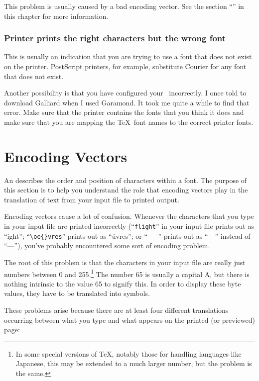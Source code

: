 This problem is usually caused by a bad encoding vector.  See the
section ``'' in this chapter for 
more information.

\subsubsection{Printer prints the right characters but the wrong font}

This is usually an indication that you are trying to use a font that
does not exist on the printer.  PostScript printers, for example,
substitute Courier for any font that does not exist.

Another possibility is that you have configured your \dvidriver\ incorrectly.
I once told  to download Galliard when I used Garamond.
It took me quite a while to find that error.
Make sure that the printer contains the fonts that you think it does
and make sure that you are mapping the \TeX\ font names to the correct printer
fonts.

\newpage
\section{Encoding Vectors}
\label{sec:fonts:encodingvec}

An  describes 
the order and position of characters within a
font.  The purpose of this section is to help you understand the role that
encoding vectors play in the translation of text from your input file to
printed output.

Encoding vectors cause a lot of confusion.  Whenever the characters that
you type in your input file are printed incorrectly (``\texttt{flight}'' in
your input file prints
out as ``ight''; ``\verb|\oe{}vres|'' prints out as ``\'uvres''; or
``\verb|---|'' prints out as ``-{}-{}-'' instead of ``---''), you've probably
encountered some sort of encoding problem.

The root of this problem is that the characters in your input
file are really just numbers between 0 and 255.\footnote{In some
special versions of \TeX, notably those for handling languages like
Japanese, this may be extended to a much larger number, but the
problem is the same.}  The number 65 is usually a capital A, but
there is nothing intrinsic to the value 65 to signify this.  In order
to display these byte values, they have to be translated into symbols.

These problems arise because there are at least four different
translations occurring between what you type and what appears on the
printed (or previewed) page:

